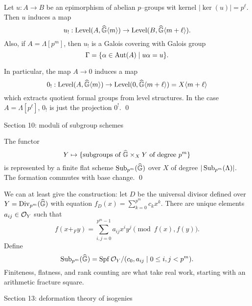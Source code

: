 \begin{lemma}
Let $u: A \to B$ be an epimorphism of abelian $p$--groups wit kernel $|\ker(u)| = p^\ell$.  Then $u$ induces a map \[u_!: \operatorname{Level}(A, \widehat{\mathbb G}\langle m\rangle) \to \operatorname{Level}(B, \widehat{\mathbb G}\langle m+\ell\rangle).\]  Also, if $A = \Lambda[p^m]$, then $u_!$ is a Galois covering with Galois group \[\Gamma = \{\alpha \in \operatorname{Aut}(A) \mid u\alpha = u\}. \qed\]
\end{lemma}

\begin{corollary}
In particular, the map $A \to 0$ induces a map \[0_!: \operatorname{Level}(A, \widehat{\mathbb G}\langle m\rangle) \to \operatorname{Level}(0, \widehat{\mathbb G}\langle m+\ell\rangle) = X\langle m+\ell\rangle\] which extracts quotient formal groups from level structures.  In the case $A = \Lambda[p^\ell]$, $0_!$ is just the projection $0^!$. \qed
\end{corollary}

Section 10: moduli of subgroup schemes

\begin{theorem}
The functor \[Y \mapsto \{\text{subgroups of $\widehat{\mathbb G} \times_X Y$ of degree $p^m$}\}\] is represented by a finite flat scheme $\operatorname{Sub}_{p^m}(\widehat{\mathbb G})$ over $X$ of degree $|\operatorname{Sub}_{p^m}(\Lambda)|$.  The formation commutes with base change. \qed
\end{theorem}

We can at least give the construction: let $D$ be the universal divisor defined over $Y = \operatorname{Div}_{p^m}(\widehat{\mathbb G})$ with equation $f_D(x) = \sum_{k=0}^{p^m} c_k x^k$.  There are unique elements $a_{ij} \in \mathcal{O}_Y$ such that \[f(x +_F y) = \sum_{i,j=0}^{p^m-1} a_{ij} x^i y^j \pmod{f(x), f(y)}.\]  Define \[\operatorname{Sub}_{p^m}(\widehat{\mathbb G}) = \operatorname{Spf} \mathcal{O}_Y / (c_0, a_{ij} \mid 0 \le i, j < p^m).\]  Finiteness, flatness, and rank counting are what take real work, starting with an arithmetic fracture square.

Section 13: deformation theory of isogenies

